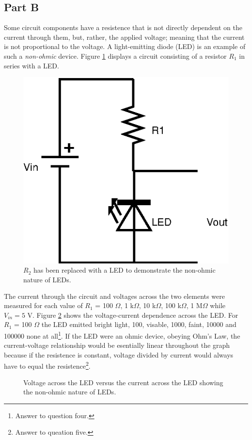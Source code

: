 \documentclass[11pt,onecolumn]{article}
\begin{document}
\subsection{Part B}
Some circuit components have a resistence that is not directly dependent on the current through them, but, rather, the applied voltage; meaning that the current is not proportional to the voltage. A light-emitting diode (LED) is an example of such a {\em non-ohmic} device. Figure \ref{fig:LED_VD} displays a circuit consisting of a resistor $R_1$ in series with a LED.
\begin{figure}
\begin{center}
\includegraphics{Diagram3.eps}
\end{center}
%
\caption{$R_2$ has been replaced with a LED to demonstrate the non-ohmic nature of LEDs.}\label{fig:LED_VD}
\end{figure}

The current through the circuit and voltages across the two elements were measured for each value of $R_1$ = 100 $\Omega$, 1 k$\Omega$, 10 k$\Omega$, 100 k$\Omega$, 1 M$\Omega$ while $V_{in} =5$ V. Figure \ref{fig:plot03} shows the  voltage-current dependence across the LED. For $R_1$ = 100 $\Omega$ the LED emitted bright light, 100, visable, 1000, faint, 10000 and 100000 none at all\footnote{Answer to question four.}. If the LED were an ohmic device, obeying Ohm's Law, the current-voltage relationship would be esentially linear throughout the graph because if the resistence is constant,  voltage divided by current would always have to equal the resistence\footnote{Answer to queation five.}.
\begin{figure}

\caption{Voltage across the LED versus the current across the LED showing the non-ohmic nature of LEDs.}\label{fig:plot03}
\end{figure}
\end{document}
